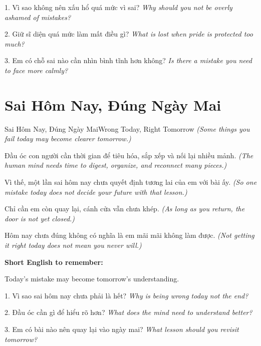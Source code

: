\begin{tuhocnhanh}
1. Vì sao không nên xấu hổ quá mức vì sai? \textit{Why should you not be overly ashamed of mistakes?}

2. Giữ sĩ diện quá mức làm mất điều gì? \textit{What is lost when pride is protected too much?}

3. Em có chỗ sai nào cần nhìn bình tĩnh hơn không? \textit{Is there a mistake you need to face more calmly?}
\end{tuhocnhanh}
\ngancach

\section{Sai Hôm Nay, Đúng Ngày Mai}
\begin{truyen}{Sai Hôm Nay, Đúng Ngày Mai}{Wrong Today, Right Tomorrow}
\textit{(Some things you fail today may become clearer tomorrow.)}

Đầu óc con người cần thời gian để tiêu hóa, sắp xếp và nối lại nhiều mảnh.
\textit{(The human mind needs time to digest, organize, and reconnect many pieces.)}

Vì thế, một lần sai hôm nay chưa quyết định tương lai của em với bài ấy.
\textit{(So one mistake today does not decide your future with that lesson.)}

Chỉ cần em còn quay lại, cánh cửa vẫn chưa khép.
\textit{(As long as you return, the door is not yet closed.)}
\end{truyen}

\begin{baihoc}
Hôm nay chưa đúng không có nghĩa là em mãi mãi không làm được.
\textit{(Not getting it right today does not mean you never will.)}
\end{baihoc}

\begin{ghinhoanh}
\textbf{Short English to remember:}

Today's mistake may become tomorrow's understanding.

\end{ghinhoanh}

\begin{tuhocnhanh}
1. Vì sao sai hôm nay chưa phải là hết? \textit{Why is being wrong today not the end?}

2. Đầu óc cần gì để hiểu rõ hơn? \textit{What does the mind need to understand better?}

3. Em có bài nào nên quay lại vào ngày mai? \textit{What lesson should you revisit tomorrow?}
\end{tuhocnhanh}
\ngancach

